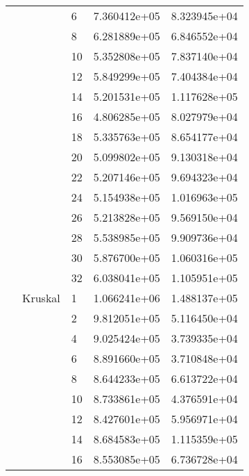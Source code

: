 \begin{tabular}{lllrr}
                      &            & 6  &  7.360412e+05 &  8.323945e+04 \\
                      &            & 8  &  6.281889e+05 &  6.846552e+04 \\
                      &            & 10 &  5.352808e+05 &  7.837140e+04 \\
                      &            & 12 &  5.849299e+05 &  7.404384e+04 \\
                      &            & 14 &  5.201531e+05 &  1.117628e+05 \\
                      &            & 16 &  4.806285e+05 &  8.027979e+04 \\
                      &            & 18 &  5.335763e+05 &  8.654177e+04 \\
                      &            & 20 &  5.099802e+05 &  9.130318e+04 \\
                      &            & 22 &  5.207146e+05 &  9.694323e+04 \\
                      &            & 24 &  5.154938e+05 &  1.016963e+05 \\
                      &            & 26 &  5.213828e+05 &  9.569150e+04 \\
                      &            & 28 &  5.538985e+05 &  9.909736e+04 \\
                      &            & 30 &  5.876700e+05 &  1.060316e+05 \\
                      &            & 32 &  6.038041e+05 &  1.105951e+05 \\
                      & Kruskal & 1  &  1.066241e+06 &  1.488137e+05 \\
                      &            & 2  &  9.812051e+05 &  5.116450e+04 \\
                      &            & 4  &  9.025424e+05 &  3.739335e+04 \\
                      &            & 6  &  8.891660e+05 &  3.710848e+04 \\
                      &            & 8  &  8.644233e+05 &  6.613722e+04 \\
                      &            & 10 &  8.733861e+05 &  4.376591e+04 \\
                      &            & 12 &  8.427601e+05 &  5.956971e+04 \\
                      &            & 14 &  8.684583e+05 &  1.115359e+05 \\
                      &            & 16 &  8.553085e+05 &  6.736728e+04 \\

\end{tabular}

